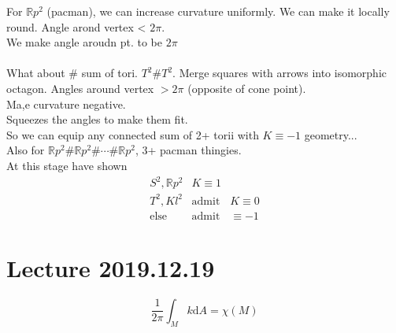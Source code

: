 \documentclass{article}
\let\ddd\cdots
\renewcommand{\d}{\mathrm{d}}
\newcommand{\R}{\mathbb{R}}
\theoremstyle{definition}
\theoremstyle{remark}
\theoremstyle{example}
\begin{document}
	For $\R p^2$ (pacman), we can increase curvature uniformly. We can make it locally round. Angle arond vertex < $2 \pi $.\\
	We make angle aroudn pt. to be $2 \pi$\\
	\\
	What about $\#$ sum of tori. $T^2 \# T^2$. Merge squares with arrows into isomorphic octagon. Angles around vertex $> 2\pi$ (opposite of cone point).\\
	Ma,e curvature negative.\\
	Squeezes the angles to make them fit.\\
	So we can equip any connected sum of 2+ torii with $K \equiv -1$ geometry...\\
	Also for $\R p^2 \# \R p^2 \# \ddd \# \R p^2$, 3+ pacman thingies.\\
	At this stage have shown \[\begin{matrix}
		S^2,\R p^2 & K \equiv 1\\
		T^2,Kl^2 & \mathrm{admit} & K \equiv 0\\
		\mathrm{else} & \mathrm{admit} & \equiv -1
	\end{matrix}\]
	
	\section*{Lecture 2019.12.19}
	\theoremstyle{Gauss-Bennett Theorem}
	\[\frac{1}{2\pi} \int_M k \d A = \chi (M)  \]
\end{document}
